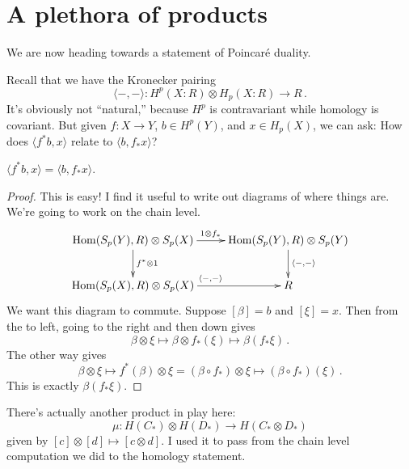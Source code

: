 \section{A plethora of products}

We are now heading towards a statement of Poincar\'e duality.

Recall that we have the Kronecker pairing 
\[
\langle-,-\rangle: H^p(X:R)\otimes H_p(X:R)\to R\,.
\]
It's obviously not ``natural,'' because $ H^p$ is contravariant while homology is covariant. But given $f:X\to Y$, $b\in H^p(Y)$, and $x\in H_p(X)$, we can ask: How does $\langle f^\ast b,x\rangle$ relate to $\langle b,f_\ast x\rangle$?
\begin{claim}
$\langle f^\ast b,x\rangle=\langle b,f_\ast x\rangle$.
\end{claim}
\begin{proof}
This is easy! I find it useful to write out diagrams of where things are. We're going to work on the chain level.
\begin{equation*}
	\xymatrix{
\Hom(S_p(Y),R)\otimes S_p(X)\ar[r]^{1\otimes f_\ast}\ar[d]^{f^\ast\otimes 1} & 
\Hom(S_p(Y),R)\otimes S_p(Y)\ar[d]^{\langle-,-\rangle} \\
\Hom(S_p(X),R)\otimes S_p(X)\ar[r]^{\langle-,-\rangle} & R
	}
\end{equation*}
We want this diagram to commute. Suppose $[\beta]=b$ and $[\xi]=x$. Then from the to left, going to the right and then down gives 
\[
\beta\otimes\xi\mapsto\beta\otimes f_\ast(\xi)\mapsto\beta(f_\ast\xi)\,.
\]
The other way gives 
\[
\beta\otimes\xi\mapsto f^\ast(\beta)\otimes\xi=(\beta\circ f_*)\otimes\xi\mapsto(\beta\circ f_*)(\xi)\,.
\]
This is exactly $\beta(f_\ast\xi)$.
\end{proof}
There's actually another product in play here: 
\[
\mu:H(C_\ast)\otimes H(D_\ast)\to H(C_\ast\otimes D_\ast)
\]
given by $[c]\otimes [d]\mapsto[c\otimes d]$. I used it to pass from the 
chain level computation we did to the homology statement.


